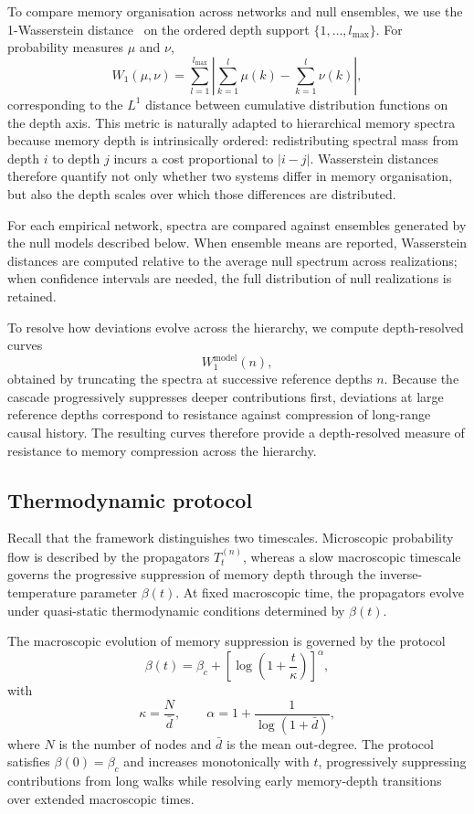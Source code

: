 \documentclass[aps,superscriptaddress,11pt]{revtex4-2}
\theoremstyle{definition}
\theoremstyle{plain}
\begin{document}
To compare memory organisation across networks and null ensembles, we use
the 1-Wasserstein distance~\cite{Villani2009} on the ordered depth support
$\{1,\ldots,l_{\max}\}$. For probability measures $\mu$ and $\nu$,
\begin{equation}
  W_1(\mu,\nu)
  =
  \sum_{l=1}^{l_{\max}}
  \left|
    \sum_{k=1}^{l}\mu(k)
    -
    \sum_{k=1}^{l}\nu(k)
  \right|,
  \label{eq:wasserstein_methods}
\end{equation}
corresponding to the $L^1$ distance between cumulative distribution
functions on the depth axis. This metric is naturally adapted to
hierarchical memory spectra because memory depth is intrinsically
ordered: redistributing spectral mass from depth $i$ to depth $j$
incurs a cost proportional to $|i-j|$. Wasserstein distances therefore
quantify not only whether two systems differ in memory organisation, but
also the depth scales over which those differences are distributed.

For each empirical network, spectra are compared against ensembles
generated by the null models described below. When ensemble means are
reported, Wasserstein distances are computed relative to the average
null spectrum across realizations; when confidence intervals are needed,
the full distribution of null realizations is retained.

To resolve how deviations evolve across the hierarchy, we compute
depth-resolved curves
\[
W_1^{\mathrm{model}}(n),
\]
obtained by truncating the spectra at successive reference depths $n$.
Because the cascade progressively suppresses deeper contributions first,
deviations at large reference depths correspond to resistance against
compression of long-range causal history. The resulting curves therefore
provide a depth-resolved measure of resistance to memory compression
across the hierarchy.


\subsection{Thermodynamic protocol}
Recall that the framework distinguishes two timescales. Microscopic probability flow is
described by the propagators $T_t^{(n)}$, whereas a slow macroscopic
timescale governs the progressive suppression of memory depth through the
inverse-temperature parameter $\beta(t)$. At fixed macroscopic time, the
propagators evolve under quasi-static thermodynamic conditions determined by
$\beta(t)$.

The macroscopic evolution of memory suppression is governed by the protocol
\begin{equation}
  \beta(t)
  =
  \beta_c
  +
  \left[
    \log\!\left(1+\frac{t}{\kappa}\right)
  \right]^{\alpha},
  \label{eq:protocol_methods}
\end{equation}
with
\[
\kappa=\frac{N}{\bar d},
\qquad
\alpha
=
1+\frac{1}{\log(1+\bar d)},
\]
where $N$ is the number of nodes and $\bar d$ is the mean out-degree. The
protocol satisfies $\beta(0)=\beta_c$ and increases monotonically with
$t$, progressively suppressing contributions from long walks while
resolving early memory-depth transitions over extended macroscopic times.
\end{document}
